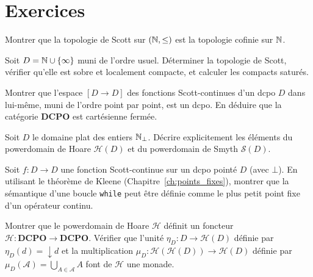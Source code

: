 \section{Exercices}

\begin{exercice}
Montrer que la topologie de Scott sur $(\mathbb{N}, \leq)$ est la topologie cofinie sur $\mathbb{N}$.
\end{exercice}

\begin{exercice}
Soit $D = \mathbb{N} \cup \{\infty\}$ muni de l'ordre usuel. D\'eterminer la topologie de Scott,
v\'erifier qu'elle est sobre et localement compacte, et calculer les compacts satur\'es.
\end{exercice}

\begin{exercice}
Montrer que l'espace $[D \to D]$ des fonctions Scott-continues d'un dcpo $D$ dans
lui-m\^eme, muni de l'ordre point par point, est un dcpo. En d\'eduire que la cat\'egorie
$\mathbf{DCPO}$ est cart\'esienne ferm\'ee.
\end{exercice}

\begin{exercice}
Soit $D$ le domaine plat des entiers $\mathbb{N}_\bot$. D\'ecrire explicitement les \'el\'ements
du powerdomain de Hoare $\mathcal{H}(D)$ et du powerdomain de Smyth $\mathcal{S}(D)$.
\end{exercice}

\begin{exercice}
Soit $f\colon D \to D$ une fonction Scott-continue sur un dcpo point\'e $D$ (avec $\bot$).
En utilisant le th\'eor\`eme de Kleene (Chapitre~\ref{ch:points_fixes}), montrer que la
s\'emantique d'une boucle \texttt{while} peut \^etre d\'efinie comme le plus petit point
fixe d'un op\'erateur continu.
\end{exercice}

\begin{exercice}
Montrer que le powerdomain de Hoare $\mathcal{H}$ d\'efinit un foncteur
$\mathcal{H}\colon \mathbf{DCPO} \to \mathbf{DCPO}$. V\'erifier que l'unit\'e
$\eta_D\colon D \to \mathcal{H}(D)$ d\'efinie par $\eta_D(d) = {\downarrow} d$ et la
multiplication $\mu_D\colon \mathcal{H}(\mathcal{H}(D)) \to \mathcal{H}(D)$ d\'efinie
par $\mu_D(\mathcal{A}) = \bigcup_{A \in \mathcal{A}} A$ font de $\mathcal{H}$ une monade.
\end{exercice}
